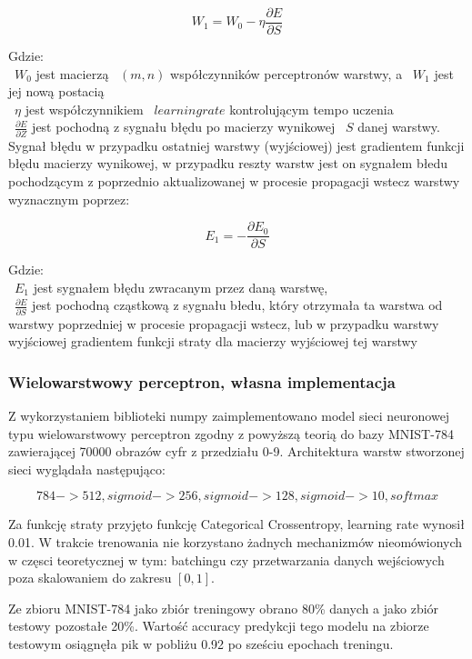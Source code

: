 \documentclass{article}
\begin{document}
$$ W_1 = W_0 - \eta \frac{\partial E}{\partial S} $$


Gdzie: \\
~$W_0$ jest macierzą ~$(m, n)$ współczynników perceptronów warstwy, a ~$W_1$ jest jej nową postacią\\
~$\eta$ jest współczynnikiem ~$learning rate$ kontrolującym tempo uczenia\\
~$\frac{\partial E}{\partial Z}$ jest pochodną z sygnału błędu po macierzy wynikowej ~$S$ danej warstwy. Sygnał błędu w przypadku ostatniej warstwy (wyjściowej) jest
gradientem funkcji błędu macierzy wynikowej, w przypadku reszty warstw jest on sygnałem błedu pochodzącym z poprzednio aktualizowanej w procesie propagacji wstecz warstwy
wyznacznym poprzez:


$$ E_1 = -\frac{\partial E_0}{\partial S} $$

Gdzie:\\
~$E_1$ jest sygnałem błędu zwracanym przez daną warstwę,\\
~$\frac{\partial E}{\partial S}$ jest pochodną cząstkową z sygnału błedu, który otrzymała ta warstwa od warstwy poprzedniej w procesie propagacji wstecz, lub w przypadku warstwy
wyjściowej gradientem funkcji straty dla macierzy wyjściowej tej warstwy\\



\subsubsection{Wielowarstwowy perceptron, własna implementacja}

Z wykorzystaniem biblioteki numpy zaimplementowano model sieci neuronowej typu wielowarstwowy perceptron zgodny z powyższą teorią do bazy MNIST-784 zawierającej 70000
obrazów cyfr z przedziału 0-9. 
Architektura warstw stworzonej sieci wyglądała następująco:

$$ 784 -> 512, sigmoid -> 256, sigmoid -> 128, sigmoid ->10, softmax $$

Za funkcję straty przyjęto funkcję Categorical Crossentropy, learning rate wynosił 0.01.
W trakcie trenowania nie korzystano żadnych mechanizmów nieomówionych 
w częsci teoretycznej w tym: batchingu czy przetwarzania danych wejściowych poza skalowaniem do zakresu $[0, 1]$.

Ze zbioru MNIST-784 jako zbiór treningowy obrano 80\% danych a jako zbiór testowy pozostałe 20\%. Wartość accuracy predykcji tego modelu na zbiorze testowym osiągnęła
pik w pobliżu 0.92 po sześciu epochach treningu.
\end{document}
